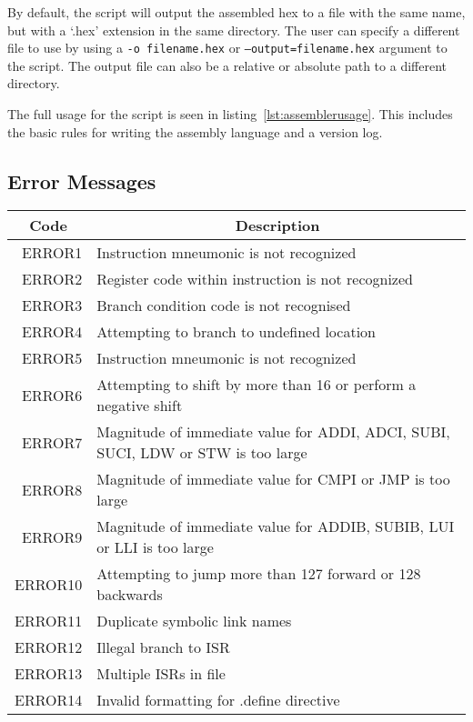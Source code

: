 By default, the script will output the assembled hex to a file with the same name, but with a `.hex' extension in the same directory.
The user can specify a different file to use by using a \texttt{-o filename.hex} or \texttt{--output=filename.hex} argument to the script.
The output file can also be a relative or absolute path to a different directory. 

The full usage for the script is seen in listing~\ref{lst:assemblerusage}. 
This includes the basic rules for writing the assembly language and a version log. 



\newpage
\subsection{Error Messages}
\begin{center}
	\centering
	\begin{tabular}{r|p{12cm}}
		\multicolumn{1}{c}{\bf Code} & \multicolumn{1}{c}{\bf Description} \\
		\hline\hline
		ERROR1& Instruction mneumonic is not recognized \\
		ERROR2& Register code within instruction is not recognized\\
		ERROR3& Branch condition code is not recognised\\
		ERROR4& Attempting to branch to undefined location \\
		ERROR5& Instruction mneumonic is not recognized \\
		ERROR6& Attempting to shift by more than 16 or perform a negative shift \\
		ERROR7& Magnitude of immediate value for ADDI, ADCI, SUBI, SUCI, LDW or STW is too large\\
		ERROR8& Magnitude of immediate value for CMPI or JMP is too large \\
		ERROR9& Magnitude of immediate value for ADDIB, SUBIB, LUI or LLI is too large \\
		ERROR10& Attempting to jump more than 127 forward or 128 backwards \\
		ERROR11& Duplicate symbolic link names \\
		ERROR12& Illegal branch to ISR \\
		ERROR13& Multiple ISRs in file \\
		ERROR14& Invalid formatting for .define directive \\
	\end{tabular}
\end{center}
